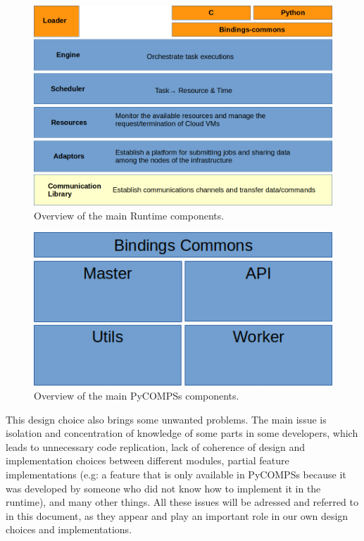 \begin{figure}
\centering
\includegraphics[scale = 0.45]{figures/runtime_modules.png}
\caption{Overview of the main Runtime components.}
\label{fig:runtime_modules}
\end{figure}

\begin{figure}
\centering
\includegraphics{figures/pycompss_modules.png}
\caption{Overview of the main PyCOMPSs components.}
\label{fig:pycompss_modules}
\end{figure}

This design choice also brings some unwanted problems. The main issue is isolation and concentration of knowledge of some parts in some developers, which leads to unnecessary code replication, lack of coherence of design and implementation choices between different modules, partial feature implementations (e.g: a feature that is only available in PyCOMPSs because it was developed by someone who did not know how to implement it in the runtime), and many other things. All these issues will be adressed and referred to in this document, as they appear and play an important role in our own design choices and implementations.

